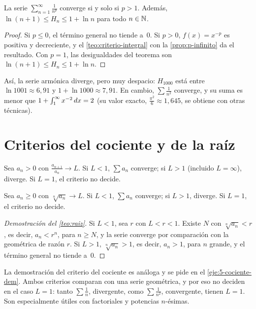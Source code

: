 \begin{corolario}[Series $p$]\label{cor:series-p}
La serie $\sum_{n=1}^{\infty}\frac{1}{n^{p}}$ converge si y solo si $p>1$. Además, $\ln(n+1)\le H_n\le1+\ln n$ para todo $n\in\mathbb{N}$.
\end{corolario}

\begin{proof}
Si $p\le0$, el término general no tiende a~$0$. Si $p>0$, $f(x)=x^{-p}$ es positiva y decreciente, y el \cref{teo:criterio-integral} con la \cref{prop:p-infinito} da el resultado. Con $p=1$, las desigualdades del teorema son $\ln(n+1)\le H_n\le1+\ln n$.
\end{proof}

Así, la serie armónica diverge, pero muy despacio: $H_{1000}$ está entre $\ln1001\approx6{,}91$ y $1+\ln1000\approx7{,}91$. En cambio, $\sum\frac{1}{n^{2}}$ converge, y su suma es menor que $1+\int_1^\infty x^{-2}\mathop{}\!d x=2$ (su valor exacto, $\frac{\pi^{2}}{6}\approx1{,}645$, se obtiene con otras técnicas).

\section{Criterios del cociente y de la raíz}

\begin{teorema}\label{teo:cociente}
Sea $a_n>0$ con $\frac{a_{n+1}}{a_n}\to L$. Si $L<1$, $\sum a_n$ converge; si $L>1$ (incluido $L=\infty$), diverge. Si $L=1$, el criterio no decide.
\end{teorema}

\begin{teorema}\label{teo:raiz}
Sea $a_n\ge0$ con $\sqrt[n]{a_n}\to L$. Si $L<1$, $\sum a_n$ converge; si $L>1$, diverge. Si $L=1$, el criterio no decide.
\end{teorema}

\begin{proof}[Demostración del \cref{teo:raiz}]
Si $L<1$, sea $r$ con $L<r<1$. Existe $N$ con $\sqrt[n]{a_n}<r$, es decir, $a_n<r^{n}$, para $n\ge N$, y la serie converge por comparación con la geométrica de razón $r$. Si $L>1$, $\sqrt[n]{a_n}>1$, es decir, $a_n>1$, para $n$ grande, y el término general no tiende a~$0$.
\end{proof}

La demostración del criterio del cociente es análoga y se pide en el \cref{eje:5-cociente-dem}. Ambos criterios comparan con una serie geométrica, y por eso no deciden en el caso $L=1$: tanto $\sum\frac1n$, divergente, como $\sum\frac{1}{n^{2}}$, convergente, tienen $L=1$. Son especialmente útiles con factoriales y potencias $n$-ésimas.

